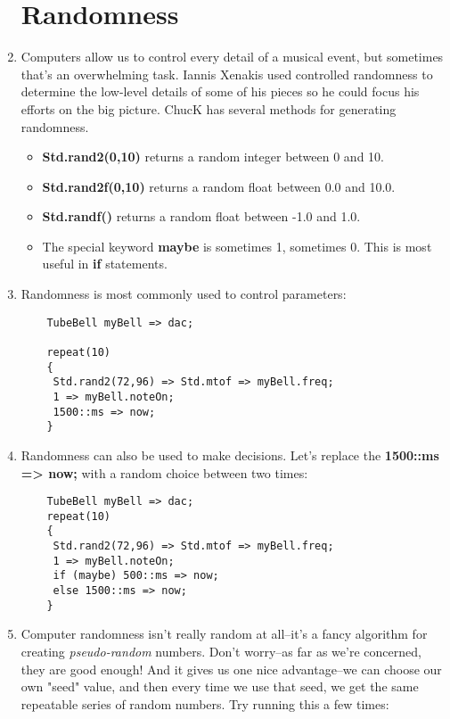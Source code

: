 \documentclass{article}
\begin{document}
\begin{enumerate}
\section{Randomness}

\item Computers allow us to control every detail of a musical event, but sometimes that's an overwhelming task. Iannis Xenakis used controlled randomness to determine the low-level details of some of his pieces so he could focus his efforts on the big picture. ChucK has several methods for generating randomness.

\begin {itemize}
\item \textbf{Std.rand2(0,10)} returns a random integer between 0 and 10.
\item \textbf{Std.rand2f(0,10)} returns a random float between 0.0 and 10.0.
\item \textbf{Std.randf()} returns a random float between -1.0 and 1.0.
\item The special keyword \textbf{maybe} is sometimes 1, sometimes 0. This is
most useful in \textbf{if} statements.
\end {itemize}

\item Randomness is most commonly used to control parameters:

\begin{lstlisting}
	TubeBell myBell => dac;

	repeat(10)
	{
	 Std.rand2(72,96) => Std.mtof => myBell.freq;
	 1 => myBell.noteOn;
	 1500::ms => now;
	}
\end{lstlisting}

\item Randomness can also be used to make decisions. Let's replace the
\textbf{1500::ms => now;} with a random choice between two times:

\begin{lstlisting}
	TubeBell myBell => dac;
	repeat(10)
	{
	 Std.rand2(72,96) => Std.mtof => myBell.freq;
	 1 => myBell.noteOn;
	 if (maybe) 500::ms => now;
	 else 1500::ms => now;
	}
\end{lstlisting}

\item Computer randomness isn't really random at all--it's a fancy algorithm for creating \textsl{pseudo-random} numbers. Don't worry--as far as we're concerned, they are good enough! And it gives us one nice advantage--we can choose our own "seed" value, and then every time we use that seed, we get the same repeatable series of random numbers. Try running this a few times:


\end{enumerate}
\end{document}
